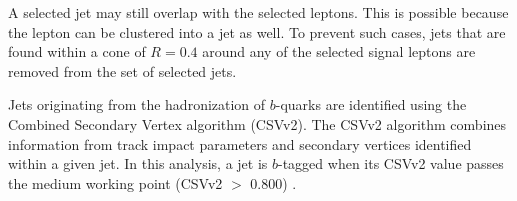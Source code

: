   A selected jet may still overlap with the selected leptons.
  This is possible because the lepton can be clustered into a jet as well.
  To prevent such cases, jets that are found within a cone of $R=0.4$ around any of the selected signal leptons are  removed from the set of selected jets.

  Jets originating from the hadronization of $b$-quarks are identified using the Combined Secondary Vertex algorithm (CSVv2). The CSVv2 algorithm combines information from track impact parameters and secondary vertices identified within a given jet.
  In this analysis, a jet is $b$-tagged when its CSVv2 value passes the medium working point (\ie CSVv2 $>$ 0.800) \citep{twiki:btag}.

